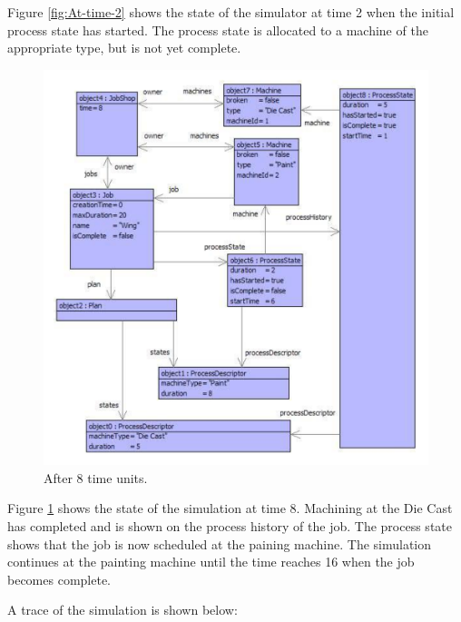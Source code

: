 Figure \ref{fig:At-time-2} shows the state of the simulator at time
2 when the initial process state has started. The process state is
allocated to a machine of the appropriate type, but is not yet complete.

%
\begin{figure}
\begin{center}

\includegraphics[width=14cm]{Programming/Simulation/Images/ProcessWing3.pdf}

\caption{After 8 time units.\label{fig:After-8-time}}

\end{center}
\end{figure}


Figure \ref{fig:After-8-time} shows the state of the simulation at
time 8. Machining at the Die Cast has completed and is shown on the
process history of the job. The process state shows that the job is
now scheduled at the paining machine. The simulation continues at
the painting machine until the time reaches 16 when the job becomes
complete.

A trace of the simulation is shown below:

